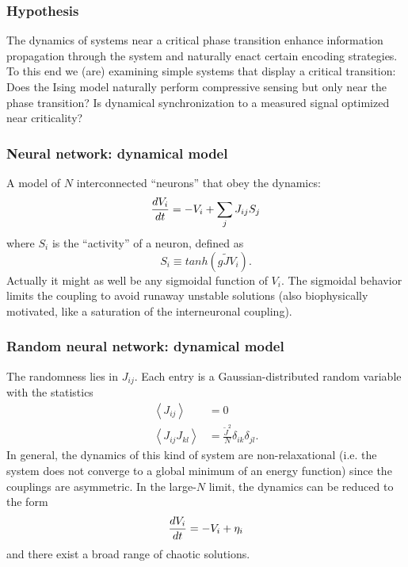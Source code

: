 \documentclass{beamer}
\begin{document}

\begin{frame}
\frametitle{Hypothesis}
The dynamics of systems near a critical phase transition enhance information propagation through the system and naturally enact certain encoding strategies.
\newline
\newline
To this end we (are) examining simple systems that display a critical transition:
\newline
\newline
Does the Ising model naturally perform compressive sensing but only near the phase transition?
\newline
\newline
Is dynamical synchronization to a measured signal optimized near criticality?

\end{frame}


\begin{frame}
\frametitle{Neural network: dynamical model}
A model of $N$ interconnected ``neurons'' that obey the dynamics:
\begin{align*}
	\frac{d V_i}{d t} = -V_i + \sum_j J_{ij} S_j
\end{align*}
where $S_i$ is the ``activity'' of a neuron, defined as
$$ S_i \equiv tanh(g\tilde{J}V_i). $$
Actually it might as well be any sigmoidal function of $V_i$.  The sigmoidal behavior limits the coupling to avoid runaway unstable solutions (also biophysically motivated, like a saturation of the interneuronal coupling).
\end{frame}


\begin{frame}
\frametitle{Random neural network: dynamical model}
The randomness lies in $J_{ij}$.  Each entry is a Gaussian-distributed random variable with the statistics
\begin{align*}
	\left\langle J_{ij} \right\rangle &= 0 \\
	\left\langle J_{ij} J_{kl} \right\rangle &= \frac{\tilde{J}^2}{N} \delta_{ik}\delta_{jl}.
\end{align*}
In general, the dynamics of this kind of system are non-relaxational (i.e. the system does not converge to a global minimum of an energy function) since the couplings are asymmetric.
\newline
\newline
In the large-$N$ limit, the dynamics can be reduced to the form
$$ \frac{d V_i}{d t} = -V_i + \eta_i $$
and there exist a broad range of chaotic solutions.

\end{frame}
\end{document}
